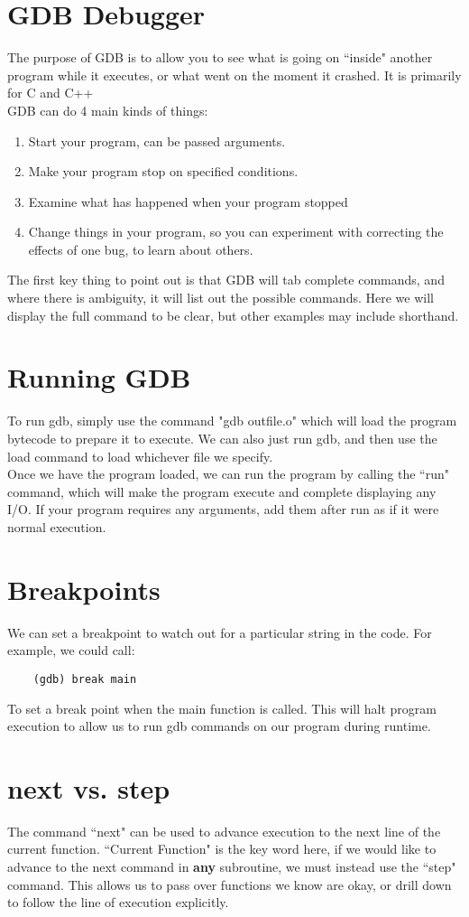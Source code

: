 \documentclass{article}
\author{Chris Wozniak}
\begin{document}
\section*{GDB Debugger}
	The purpose of GDB is to allow you to see what is going on ``inside" another program while it
	executes, or what went on the moment it crashed. It is primarily for C and C++\\
	
	GDB can do 4 main kinds of things:
	\begin{enumerate}
		\item Start your program, can be passed arguments.
		\item Make your program stop on specified conditions.
		\item Examine what has happened when your program stopped
		\item Change things in your program, so you can experiment with correcting
			the effects of one bug, to learn about others.
	\end{enumerate}
	The first key thing to point out is that GDB will tab complete commands, and where there is
	ambiguity, it will list out the possible commands. Here we will display the full command
	to be clear, but other examples may include shorthand.

\section*{Running GDB}
	To run gdb, simply use the command "gdb outfile.o" which will load the program bytecode
	to prepare it to execute. We can also just run gdb, and then use the load command to load
	whichever file we specify.\\

	Once we have the program loaded, we can run the program by calling the ``run" command, which
	will make the program execute and complete displaying any I/O. If your program requires
	any arguments, add them after run as if it were normal execution.

\section*{Breakpoints}
	We can set a breakpoint to watch out for a particular string in the code. For example, 
	we could call:
	\begin{lstlisting}
	(gdb) break main
	\end{lstlisting}
	To set a break point when the main function is called. This will halt program execution		
	to allow us to run gdb commands on our program during runtime.

\section*{next vs. step}
	The command ``next" can be used to advance execution to the next line of the current function.
	``Current Function" is the key word here, if we would like to advance to the next command
	in \textbf{any} subroutine, we must instead use the ``step" command. This allows us to pass
	over functions we know are okay, or drill down to follow the line of execution explicitly.
\end{document}
